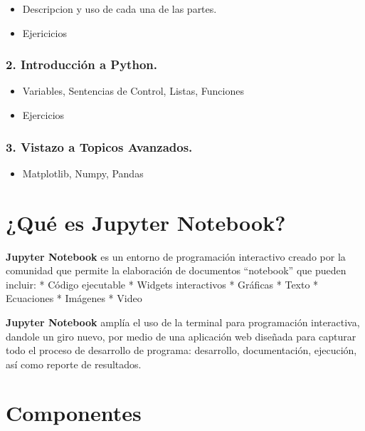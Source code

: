 \documentclass[11pt]{article}
\providecommand{\tightlist}{%
      \setlength{\itemsep}{0pt}\setlength{\parskip}{0pt}}
\begin{document}
\begin{itemize}
\tightlist
\item
  Descripcion y uso de cada una de las partes.
\item
  Ejericicios
\end{itemize}

\hypertarget{introducciuxf3n-a-python.}{%
\subsubsection{2. Introducción a
Python.}\label{introducciuxf3n-a-python.}}

\begin{itemize}
\tightlist
\item
  Variables, Sentencias de Control, Listas, Funciones
\item
  Ejercicios
\end{itemize}

\hypertarget{vistazo-a-topicos-avanzados.}{%
\subsubsection{3. Vistazo a Topicos
Avanzados.}\label{vistazo-a-topicos-avanzados.}}

\begin{itemize}
\tightlist
\item
  Matplotlib, Numpy, Pandas
\end{itemize}

    \hypertarget{quuxe9-es-jupyter-notebook}{%
\section{¿Qué es Jupyter Notebook?}\label{quuxe9-es-jupyter-notebook}}

\textbf{Jupyter Notebook} es un entorno de programación interactivo
creado por la comunidad que permite la elaboración de documentos
``notebook'' que pueden incluir: * Código ejecutable * Widgets
interactivos * Gráficas * Texto * Ecuaciones * Imágenes * Video

\textbf{Jupyter Notebook} amplía el uso de la terminal para programación
interactiva, dandole un giro nuevo, por medio de una aplicación web
diseñada para capturar todo el proceso de desarrollo de programa:
desarrollo, documentación, ejecución, así como reporte de resultados.

    \hypertarget{componentes}{%
\section{Componentes}\label{componentes}}
\end{document}
